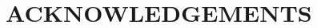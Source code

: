 \documentclass[
]{article}
\begin{document}
    \section{ACKNOWLEDGEMENTS}\label{acknowledgements}
    \newpage


    \tableofcontents
    \newpage


    \begin{spacing}{1.5}
        

        

        

        

        
        
    \end{spacing}
\end{document}
